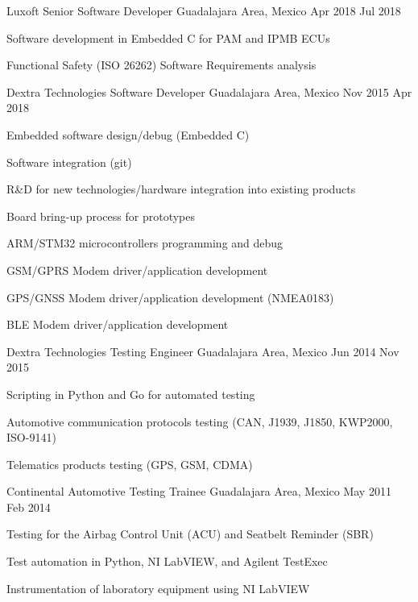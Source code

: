 \documentclass[10pt, letterpaper]{article} %
\begin{document}

\job
{Luxoft}
{Senior Software Developer}
{Guadalajara Area, Mexico}
{Apr 2018}
{Jul 2018}
{
\begin{itemize-bullets}
\item{Software development in Embedded C for PAM and IPMB ECUs}
\item{Functional Safety (ISO 26262) Software Requirements analysis}
\end{itemize-bullets}
}


\job
{Dextra Technologies}
{Software Developer}
{Guadalajara Area, Mexico}
{Nov 2015}
{Apr 2018}
{
\begin{itemize-bullets}
\item{Embedded software design/debug (Embedded C)}
\item{Software integration (git)}
\item{R\&D for new technologies/hardware integration into existing products}
\item{Board bring-up process for prototypes}
\item{ARM/STM32 microcontrollers programming and debug}
\item{GSM/GPRS Modem driver/application development}
\item{GPS/GNSS Modem driver/application development (NMEA0183)}
\item{BLE Modem driver/application development}
\end{itemize-bullets}
}


\job
{Dextra Technologies}
{Testing Engineer}
{Guadalajara Area, Mexico}
{Jun 2014}
{Nov 2015}
{
\begin{itemize-bullets}
\item{Scripting in Python and Go for automated testing }
\item{Automotive communication protocols testing (CAN, J1939, J1850, KWP2000, ISO-9141)}
\item{Telematics products testing (GPS, GSM, CDMA)}
\end{itemize-bullets}
}

\pagebreak


\job
{Continental Automotive}
{Testing Trainee}
{Guadalajara Area, Mexico}
{May 2011}
{Feb 2014}
{
\begin{itemize-bullets}
\item{Testing for the Airbag Control Unit (ACU) and Seatbelt Reminder (SBR)}
\item{Test automation in Python, NI LabVIEW, and Agilent TestExec}
\item{Instrumentation of laboratory equipment using NI LabVIEW}
\end{itemize-bullets}
}
\end{document}
